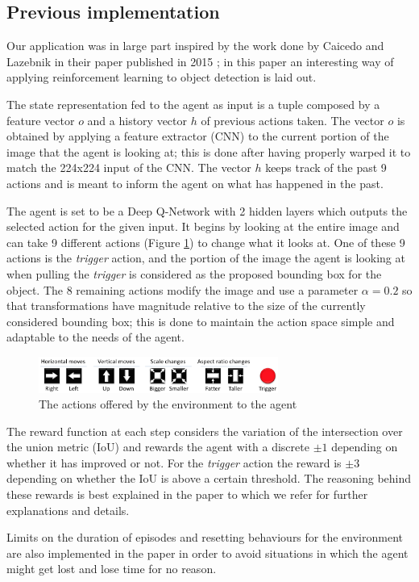 \newpage


\subsection{Previous implementation}
Our application was in large part inspired by the work done by Caicedo and Lazebnik in their paper published in 2015 \cite{caicedo2015active}; in this paper an interesting way of applying reinforcement learning to object detection is laid out.

The state representation fed to the agent as input is a tuple composed by a feature vector $o$ and a history vector $h$ of previous actions taken. The vector $o$ is obtained by applying a feature extractor (CNN) to the current portion of the image that the agent is looking at; this is done after having properly warped it to match the 224x224 input of the CNN. The vector $h$ keeps track of the past 9 actions and is meant to inform the agent on what has happened in the past.

The agent is set to be a Deep Q-Network \cite{mnih2015human} with 2 hidden layers which outputs the selected action for the given input. It begins by looking at the entire image and can take 9 different actions (Figure \ref{fig:environment-actions-from-base-paper}) to change what it looks at. One of these 9 actions is the \textit{trigger} action, and the portion of the image the agent is looking at when pulling the \textit{trigger} is considered as the proposed bounding box for the object. The 8 remaining actions modify the image and use a parameter $\alpha = 0.2$ so that transformations have magnitude relative to the size of the currently considered bounding box; this is done to maintain the action space simple and adaptable to the needs of the agent.

\begin{figure}[h!]
    \centering
    \includegraphics[width=0.7\textwidth]{figures/environment-actions-from-base-paper.png}
    \caption{The actions offered by the environment to the agent\cite{caicedo2015active}}
    \label{fig:environment-actions-from-base-paper}
\end{figure}

The reward function at each step considers the variation of the intersection over the union metric (IoU) and rewards the agent with a discrete $\pm 1$ depending on whether it has improved or not. For the \textit{trigger} action the reward is $\pm 3$ depending on whether the IoU is above a certain threshold. The reasoning behind these rewards is best explained in the paper to which we refer for further explanations and details.

Limits on the duration of episodes and resetting behaviours for the environment are also implemented in the paper in order to avoid situations in which the agent might get lost and lose time for no reason.

